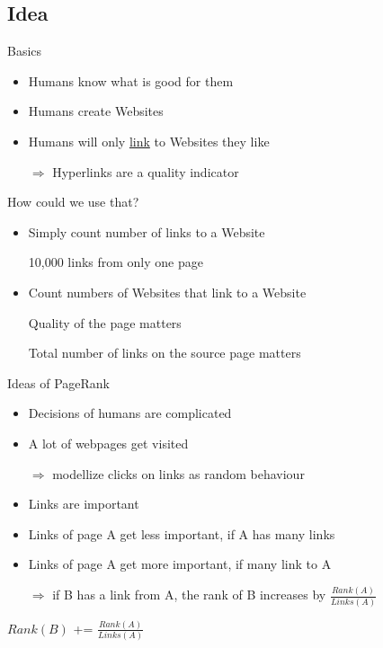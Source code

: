 \subsection{Idea}
\begin{frame}{Basics}
    \begin{itemize}[<+->]
        \item Humans know what is good for them
        \item Humans create Websites
        \item Humans will only \href{http://en.wikipedia.org/wiki/Hyperlink}{link} to Websites they like
        \item[$\Rightarrow$] Hyperlinks are a quality indicator
    \end{itemize}
\end{frame}

\begin{frame}{How could we use that?}
    \begin{itemize}[<+->]
        \item Simply count number of links to a Website
        \item[\xmark] 10,000 links from only one page
        \item Count numbers of Websites that link to a Website
        \item[\xmark] Quality of the page matters
        \item[\xmark] Total number of links on the source page matters
    \end{itemize}
\end{frame}


\begin{frame}{Ideas of PageRank}
    \begin{itemize}[<+->]
        \item Decisions of humans are complicated
        \item A lot of webpages get visited
        \item[$\Rightarrow$] modellize clicks on links as random behaviour
        \item Links are important
        \item Links of page A get less important, if A has many links
        \item Links of page A get more important, if many link to A
        \item[$\Rightarrow$] if B has a link from A, the rank of B increases by $\frac{Rank(A)}{Links(A)}$
    \end{itemize}

    \pause[\thebeamerpauses]

    \begin{algorithmic}
            \State $Rank(B)$ += $\frac{Rank(A)}{Links(A)}$
        \EndIf
    \end{algorithmic}
\end{frame}

